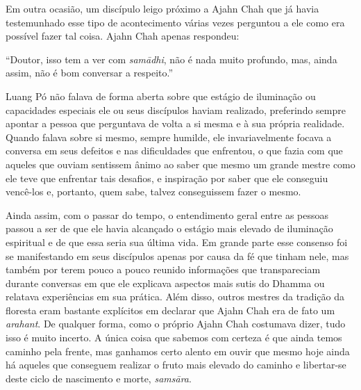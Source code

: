 Em outra ocasião, um discípulo leigo próximo a Ajahn Chah que já havia
testemunhado esse tipo de acontecimento várias vezes perguntou a ele
como era possível fazer tal coisa. Ajahn Chah apenas respondeu:

``Doutor, isso tem a ver com \emph{samādhi}, não é nada muito profundo,
mas, ainda assim, não é bom conversar a respeito.''

Luang Pó não falava de forma aberta sobre que estágio de iluminação ou
capacidades especiais ele ou seus discípulos haviam realizado,
preferindo sempre apontar a pessoa que perguntava de volta a si mesma e
à sua própria realidade. Quando falava sobre si mesmo, sempre humilde,
ele invariavelmente focava a conversa em seus defeitos e nas
dificuldades que enfrentou, o que fazia com que aqueles que ouviam
sentissem ânimo ao saber que mesmo um grande mestre como ele teve que
enfrentar tais desafios, e inspiração por saber que ele conseguiu
vencê-los e, portanto, quem sabe, talvez conseguissem fazer o mesmo.

Ainda assim, com o passar do tempo, o entendimento geral entre as
pessoas passou a ser de que ele havia alcançado o estágio mais elevado
de iluminação espiritual e de que essa seria sua última vida. Em grande
parte esse consenso foi se manifestando em seus discípulos apenas por
causa da fé que tinham nele, mas também por terem pouco a pouco reunido
informações que transpareciam durante conversas em que ele explicava
aspectos mais sutis do Dhamma ou relatava experiências em sua prática.
Além disso, outros mestres da tradição da floresta eram bastante
explícitos em declarar que Ajahn Chah era de fato um \emph{arahant}. De
qualquer forma, como o próprio Ajahn Chah costumava dizer, tudo isso é
muito incerto. A única coisa que sabemos com certeza é que ainda temos
caminho pela frente, mas ganhamos certo alento em ouvir que mesmo hoje
ainda há aqueles que conseguem realizar o fruto mais elevado do caminho
e libertar-se deste ciclo de nascimento e morte, \emph{samsāra}.

